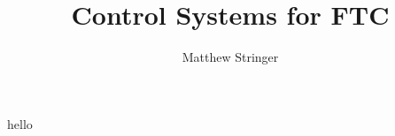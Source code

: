 \documentclass[12pt]{article}
\title{Control Systems for FTC}
\author{Matthew Stringer}
\date{}
\begin{document}
    \maketitle
    \newpage
    hello
\end{document}
